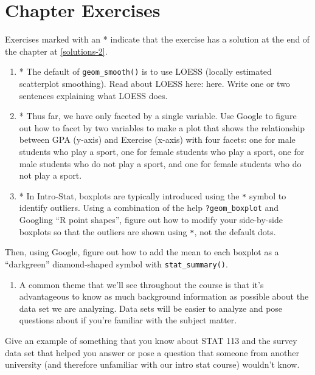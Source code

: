\documentclass[
]{book}
\providecommand{\tightlist}{%
  \setlength{\itemsep}{0pt}\setlength{\parskip}{0pt}}
\begin{document}
\hypertarget{chapexercise-2}{%
\section{Chapter Exercises}\label{chapexercise-2}}

Exercises marked with an * indicate that the exercise has a solution at the end of the chapter at \ref{solutions-2}.

\begin{enumerate}
\def\labelenumi{\arabic{enumi}.}
\item
  * The default of \texttt{geom\_smooth()} is to use LOESS (locally estimated scatterplot smoothing). Read about LOESS here: here. Write one or two sentences explaining what LOESS does.
\item
  * Thus far, we have only faceted by a single variable. Use Google to figure out how to facet by two variables to make a plot that shows the relationship between GPA (y-axis) and Exercise (x-axis) with four facets: one for male students who play a sport, one for female students who play a sport, one for male students who do not play a sport, and one for female students who do not play a sport.
\item
  * In Intro-Stat, boxplots are typically introduced using the \texttt{*} symbol to identify outliers. Using a combination of the help \texttt{?geom\_boxplot} and Googling ``R point shapes'', figure out how to modify your side-by-side boxplots so that the outliers are shown using \texttt{*}, not the default dots.
\end{enumerate}

Then, using Google, figure out how to add the mean to each boxplot as a ``darkgreen'' diamond-shaped symbol with \texttt{stat\_summary()}.

\begin{enumerate}
\def\labelenumi{\arabic{enumi}.}
\setcounter{enumi}{3}
\tightlist
\item
  A common theme that we'll see throughout the course is that it's advantageous to know as much background information as possible about the data set we are analyzing. Data sets will be easier to analyze and pose questions about if you're familiar with the subject matter.
\end{enumerate}

Give an example of something that you know about STAT 113 and the survey data set that helped you answer or pose a question that someone from another university (and therefore unfamiliar with our intro stat course) wouldn't know.
\end{document}
